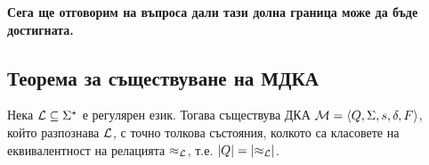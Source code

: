 {\bf Сега ще отговорим на въпроса дали тази долна граница може да бъде достигната.}


\subsection{Теорема за съществуване на МДКА}
\begin{thm}
  \label{th:myhill-nerode}
  Нека $\mathcal{L}\subseteq \Sigma^\star$ е регулярен език.
  Тогава съществува ДКА $\mathcal{M} = \langle{Q,\Sigma,s,\delta,F}\rangle$, който разпознава $\mathcal{L}$,
  с точно толкова състояния, колкото са класовете на еквивалентност на релацията $\approx_{\mathcal{L}}$,
  т.е. $\lvert{Q}\rvert = \lvert{\approx_{\mathcal{L}}}\rvert$.
\end{thm}
